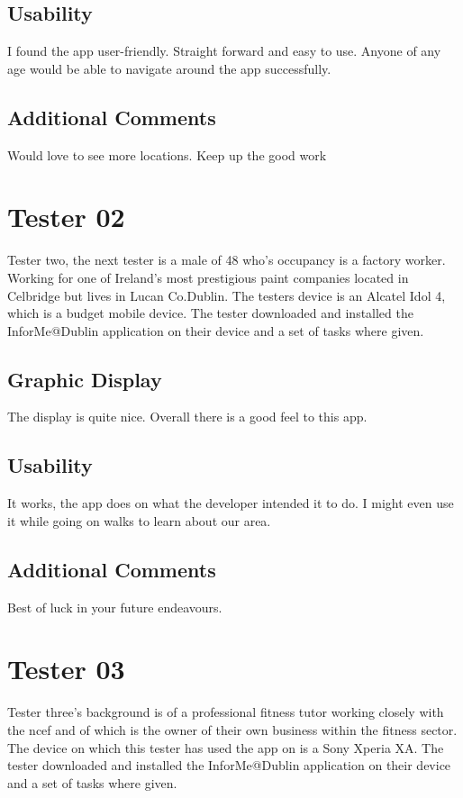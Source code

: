 \subsection{Usability}
I found the app user-friendly. Straight forward and easy to use. Anyone of any age would be able to navigate around the app successfully.

\subsection{Additional Comments}
Would love to see more locations. Keep up the good work

\section{Tester 02}
Tester two, the next tester is a male of 48 who's occupancy is a factory worker. Working for one of Ireland's most prestigious paint companies located in Celbridge but lives in Lucan Co.Dublin. The testers device is an Alcatel Idol 4, which is a budget mobile device. The tester downloaded and installed the InforMe@Dublin application on their device and a set of tasks where given.

\subsection{Graphic Display}
The display is quite nice. Overall there is a good feel to this app.

\subsection{Usability}
It works, the app does on what the developer intended it to do. I might even use it while going on walks to learn about our area.

\subsection{Additional Comments}
Best of luck in your future endeavours.

\section{Tester 03}
Tester three's background is of a professional fitness tutor working closely with the ncef and of which is the owner of their own business within the fitness sector. The device on which this tester has used the app on is a Sony Xperia XA. The tester downloaded and installed the InforMe@Dublin application on their device and a set of tasks where given.


